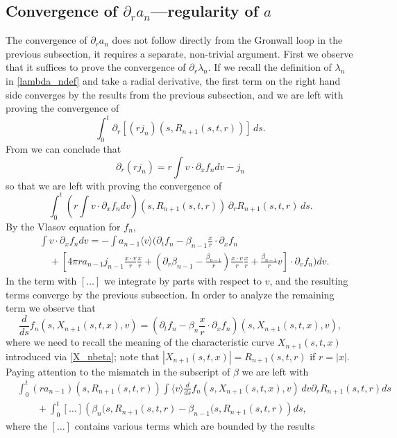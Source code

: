 \documentclass[11pt]{article}
\def\p0{\langle v \rangle}
\begin{document}
\subsection{Convergence of $\partial_r a_n$---regularity of $a$}\label{convader}
%
%
The convergence of $\partial_r a_n$ does not follow directly from the
Gronwall loop in the previous subsection, it requires a separate,
non-trivial argument. First we observe that it suffices to prove the
convergence of $\partial_r \lambda_n$. If we recall the definition of
$\lambda_n$ in \eqref{lambda_ndef} and take a radial derivative, the first
term on the right hand side converges by the results from the previous
subsection, and we are left with proving the convergence of
\[
\int_0^t \partial_r\left[(r j_n)(s,R_{n+1}(s,t,r))\right]\, ds .
\]
From \cite[Lemma 6.6, Lemma 6.8]{GB} we can conclude that
\[
\partial_r(r j_n) = r \int v\cdot \partial_x f_n dv - j_n
\]
so that we are left with proving the convergence of
\[
\int_0^t \left(r \int v\cdot \partial_x f_n dv\right)(s,R_{n+1}(s,t,r))\,
\partial_r R_{n+1}(s,t,r)\, ds .
\]
By the Vlasov equation for $f_n$,
\begin{align*}
  & \int v\cdot \partial_x f_n dv
  = - \int a_{n-1} \p0
  \biggl( \partial_t f_n - \beta_{n-1} \frac{x}{r}\cdot \partial_x f_n\\
  &\quad
  {}+\left[4\pi r a_{n-1}j_{n-1} \frac{x\cdot v}{r}  \frac{x}{r}
    + \left(\partial_r\beta_{n-1}
    -\frac{\beta_{n-1}}{r}\right)\frac{x\cdot v}{r}  \frac{x}{r}
    + \frac{\beta_{n-1}}{r} v\right]\cdot \partial_v f_n\biggl) dv.
\end{align*}
In the term with $[\dots]$ we integrate by parts with respect to $v$,
and the resulting terms converge by the previous subsection.
In order to analyze the remaining term we observe that
\[
\frac{d}{ds} f_n(s,X_{n+1}(s,t,x),v) =
\left(\partial_t f_n -\beta_{n} \frac{x}{r}\cdot
\partial_x f_n\right)(s,X_{n+1}(s,t,x),v),
\]
where we need to recall the meaning of the characteristic curve $X_{n+1}(s,t,x)$
introduced via \eqref{X_nbeta}; note that $|X_{n+1}(s,t,x)|= R_{n+1}(s,t,r)$
if $r=|x|$.
Paying attention to the mismatch in the subscript of $\beta$ we are left with
\begin{align*}
  & \int_0^t (r a_{n-1})(s,R_{n+1}(s,t,r))
  \int \p0 \frac{d}{ds} f_n(s,X_{n+1}(s,t,x),v)\,dv \partial_r R_{n+1}(s,t,r) ds\\
  &\qquad
       {}+\int_0^t [\ldots]
       \left(\beta_n(s,R_{n+1}(s,t,r) -\beta_{n-1}(s,R_{n+1}(s,t,r)\right) ds,
\end{align*}
where the $[\ldots]$ contains various terms which are bounded by the results
\end{document}
